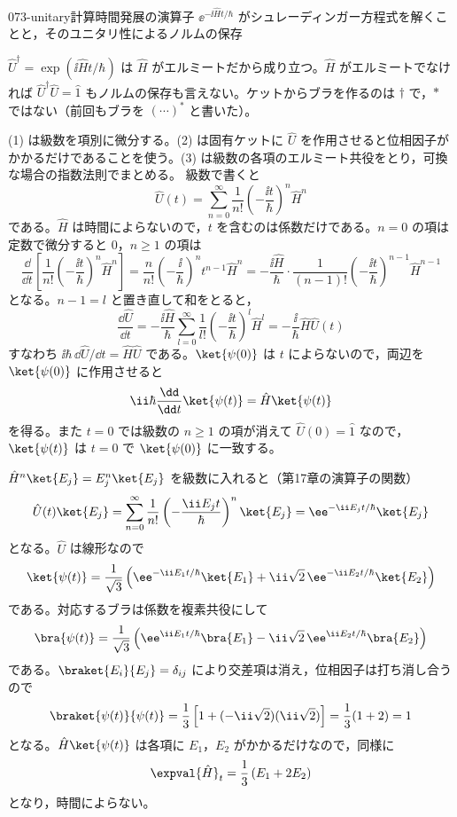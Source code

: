 \documentclass[uplatex,dvipdfmx,a4paper,11pt]{jsarticle}
\begin{document}
\begin{mondai}{073-unitary}{計算}{時間発展の演算子 $\ee^{-\ii\hat{H}t/\hbar}$ がシュレーディンガー方程式を解くことと，そのユニタリ性によるノルムの保存}
\begin{kizuki}
\item {} $\hat{U}^{\dagger}=\exp(\ii\hat{H}t/\hbar)$ は $\hat{H}$ がエルミートだから成り立つ。$\hat{H}$ がエルミートでなければ $\hat{U}^{\dagger}\hat{U}=\hat{1}$ もノルムの保存も言えない。ケットからブラを作るのは $\dagger$ で，$*$ ではない（前回もブラを $(\cdots)^{*}$ と書いた）。
\end{kizuki}
\begin{tadashii}
\houshin (1) は級数を項別に微分する。(2) は固有ケットに $\hat{U}$ を作用させると位相因子がかかるだけであることを使う。(3) は級数の各項のエルミート共役をとり，可換な場合の指数法則でまとめる。
\keisan {} 級数で書くと
\[ \hat{U}(t)=\sum_{n=0}^{\infty}\frac{1}{n!}\left(-\frac{\ii t}{\hbar}\right)^{n}\hat{H}^{n} \]
である。$\hat{H}$ は時間によらないので，$t$ を含むのは係数だけである。$n=0$ の項は定数で微分すると $0$，$n\ge1$ の項は
\[ \frac{\dd}{\dd t}\left[\frac{1}{n!}\left(-\frac{\ii t}{\hbar}\right)^{n}\hat{H}^{n}\right]=\frac{n}{n!}\left(-\frac{\ii}{\hbar}\right)^{n}t^{n-1}\hat{H}^{n}=-\frac{\ii\hat{H}}{\hbar}\cdot\frac{1}{(n-1)!}\left(-\frac{\ii t}{\hbar}\right)^{n-1}\hat{H}^{n-1} \]
となる。$n-1=l$ と置き直して和をとると，
\[ \frac{\dd\hat{U}}{\dd t}=-\frac{\ii\hat{H}}{\hbar}\sum_{l=0}^{\infty}\frac{1}{l!}\left(-\frac{\ii t}{\hbar}\right)^{l}\hat{H}^{l}=-\frac{\ii}{\hbar}\hat{H}\hat{U}(t) \]
すなわち $\ii\hbar\,\dd\hat{U}/\dd t=\hat{H}\hat{U}$ である。$\ket{\psi(0)}$ は $t$ によらないので，両辺を $\ket{\psi(0)}$ に作用させると
\[ \ii\hbar\frac{\dd}{\dd t}\ket{\psi(t)}=\hat{H}\ket{\psi(t)} \]
を得る。また $t=0$ では級数の $n\ge1$ の項が消えて $\hat{U}(0)=\hat{1}$ なので，$\ket{\psi(t)}$ は $t=0$ で $\ket{\psi(0)}$ に一致する。

 $\hat{H}^{n}\ket{E_{j}}=E_{j}^{n}\ket{E_{j}}$ を級数に入れると（第17章の演算子の関数）
\[ \hat{U}(t)\ket{E_{j}}=\sum_{n=0}^{\infty}\frac{1}{n!}\left(-\frac{\ii E_{j}t}{\hbar}\right)^{n}\ket{E_{j}}=\ee^{-\ii E_{j}t/\hbar}\ket{E_{j}} \]
となる。$\hat{U}$ は線形なので
\[ \ket{\psi(t)}=\frac{1}{\sqrt{3}}\left(\ee^{-\ii E_{1}t/\hbar}\ket{E_{1}}+\ii\sqrt{2}\,\ee^{-\ii E_{2}t/\hbar}\ket{E_{2}}\right) \]
である。対応するブラは係数を複素共役にして
\[ \bra{\psi(t)}=\frac{1}{\sqrt{3}}\left(\ee^{\ii E_{1}t/\hbar}\bra{E_{1}}-\ii\sqrt{2}\,\ee^{\ii E_{2}t/\hbar}\bra{E_{2}}\right) \]
である。$\braket{E_{i}}{E_{j}}=\delta_{ij}$ により交差項は消え，位相因子は打ち消し合うので
\[ \braket{\psi(t)}{\psi(t)}=\frac{1}{3}\left[1+(-\ii\sqrt{2})(\ii\sqrt{2})\right]=\frac{1}{3}(1+2)=1 \]
となる。$\hat{H}\ket{\psi(t)}$ は各項に $E_{1}$，$E_{2}$ がかかるだけなので，同様に
\[ \expval{\hat{H}}_{t}=\frac{1}{3}\left(E_{1}+2E_{2}\right) \]
となり，時間によらない。


\end{tadashii}
\end{mondai}
\end{document}
